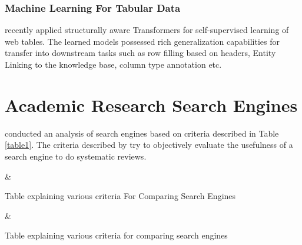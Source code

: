 \subsubsection{Machine Learning For Tabular Data}
\cite{deng2020turl} recently applied structurally aware Transformers for self-supervised learning of web tables. The learned models possessed rich generalization capabilities for transfer into downstream tasks such as row filling based on headers, Entity Linking to the knowledge base, column type annotation etc. 

\section{Academic Research Search Engines}
\label{relatedwork:acad-search-engine}
\cite{gusenbauer2020academic} conducted an analysis of search engines based on criteria described in Table \ref{table1}.
The criteria described by \cite{gusenbauer2020academic} try to objectively evaluate the usefulness of a search engine to do systematic reviews.

\begin{table}[h]
    \label{table\arabic{tablecounter}}
            {\Criteria & \Meaning}
            \centering
            \caption{\label{tablecounter}Table explaining various criteria For Comparing Search Engines}
\end{table}

\begin{table}[h]
    \label{table\arabic{tablecounter}}
            {\Criteria & \Meaning}
            \centering
            \caption{\label{tablecounter}Table explaining various criteria for comparing search engines}
\end{table}


